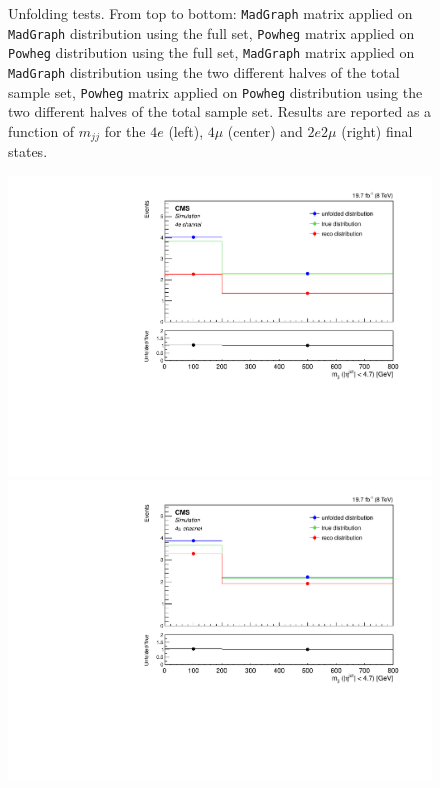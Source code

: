 \begin{figure}[hbtp]
\begin{center}
      \caption{Unfolding tests. From top to bottom: \texttt{MadGraph} matrix applied on \texttt{MadGraph} distribution using the full set, \texttt{Powheg} matrix applied on \texttt{Powheg} distribution using the full set,  \texttt{MadGraph} matrix applied on \texttt{MadGraph} distribution using the two different halves of the total sample set, \texttt{Powheg} matrix applied on \texttt{Powheg} distribution using the two different halves of the total sample set. Results are reported as a function of $m_{jj}$ for the $4e$ (left), $4\mu$ (center) and $2e2\mu$ (right) final states.}
    \label{fig:MCtest_Mjj1}
  \end{center}
\end{figure}

\begin{figure}[hbtp]
  \begin{center}
    \includegraphics[width=0.8\cmsFigWidth]{Figures/Unfolding/MCTests/Mjj_ZZTo4e_MadMatrix_PowDistr_FullSample_fr}     
    \includegraphics[width=0.8\cmsFigWidth]{Figures/Unfolding/MCTests/Mjj_ZZTo4m_MadMatrix_PowDistr_FullSample_fr}     

\end{center}
\end{figure}

